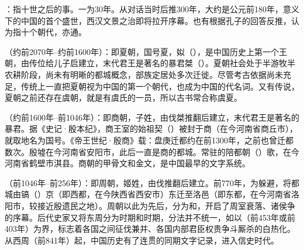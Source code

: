 {
\item {}：指十世之后的事。一为30年。从对话当时后推300年，大约是公元前180年，意义下的中国的首个盛世，西汉文景之治即将拉开序幕。也有根据孔子的回答反推，认为指十个朝代，亦通。

\item {}（约前2070年--约前1600年）：即夏朝，国号夏，姒（），是中国历史上第一个王朝，由传位给儿子启建立，末代君王是著名的暴君桀（）。夏朝社会处于半游牧半农耕阶段，尚未有明晰的都城概念，部族定居处多次迁徙。尽管考古依据尚未充足，传统上一直把夏朝视为中国的第一个朝代，也成为中国的代名词。又有传说，夏朝之前还存在虞朝，就是有虞氏的一员，所以古书常合称虞夏。

（约前1600年--前1046年）：即商朝，子姓，由伐桀推翻后建立，末代君王是著名的暴君。据《史记·殷本纪》，商王室的始祖契（）被封于商（在今河南省商丘市），就取地名为国号。《帝王世纪·殷商》载：盘庚迁都约在前1300年，之前也曾迁都数次。殷墟在今河南省安阳市，此后一直是商的都城。常驻的陪都朝（）歌，在今河南省鹤壁市淇县。商朝的甲骨文和金文，是中国最早的文字系统。%

（前1046年--前256年）：即周朝，姬姓，由伐推翻后建立。前770年，为躲避，将都城由镐（）京（即西都，在今陕西省西安市）东迁至洛邑（即东都，在今河南省洛阳市，较接近殷遗民之地）。周朝以此为先后，分为和，开启了周室衰落、诸侯争的序幕。后代史家又将东周分为时期和时期，分法并不统一，如以（前453年或前403年）为界，标志着各国之间征伐兼并、各国内部君臣权贵争斗厮杀的白热化。从西周（前841年）起，中国历史有了连贯的同期文字记录，进入信史时代。

}
